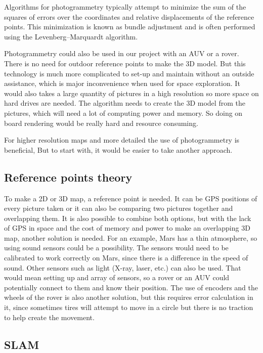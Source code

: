 Algorithms for photogrammetry typically attempt to minimize the sum of the squares of errors over the coordinates and relative displacements of the reference points. This minimization is known as bundle adjustment and is often performed using the Levenberg–Marquardt algorithm\cite{photo}.

Photogrammetry could also be used in our project with an AUV or a rover. There is no need for outdoor reference points to make the 3D model. But this technology is much more complicated to set-up and maintain without an outside assistance, which is major inconvenience when used for space exploration. It would also takes a large quantity of pictures in a high resolution so more space on hard drives are needed. The algorithm needs to create the 3D model from the pictures, which will need a lot of computing power and memory. So doing on board rendering would be really hard and resource consuming.

For higher resolution maps and more detailed the use of photogrammetry is beneficial, But to start with, it would be easier to take another approach. %

\subsection{Reference points theory}

To make a 2D or 3D map, a reference point is needed. It can be GPS positions of every picture taken or it can also be comparing two pictures together and overlapping them. It is also possible to combine both options, but with the lack of GPS in space and the cost of memory and power to make an overlapping 3D map, another solution is needed. For an example, Mars has a thin atmosphere, so using sound sensors could be a possibility. The sensors would need to be calibrated to work correctly on Mars, since there is a difference in the speed of sound. Other sensors such as light (X-ray, laser, etc.) can also be used. That would mean setting up and array of sensors, so a rover or an AUV could potentially connect to them and know their position. The use of encoders and the wheels of the rover is also another solution, but this requires error calculation in it, since sometimes tires will attempt to move in a circle but there is no traction to help create the movement\cite{reference}.

\subsection{SLAM}


